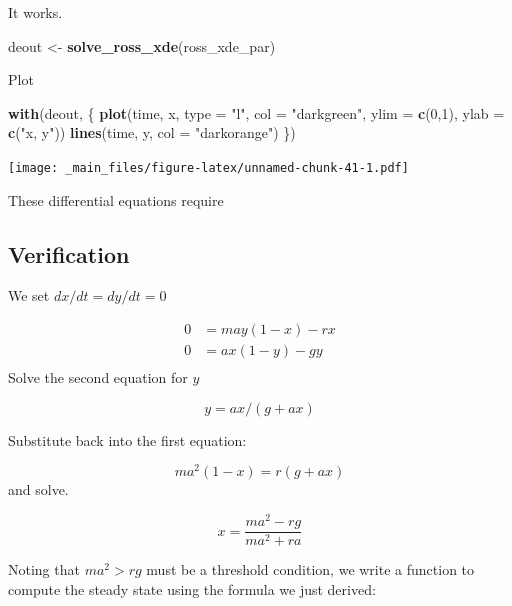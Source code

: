 \documentclass[
]{book}
\newenvironment{Shaded}{\begin{snugshade}}{\end{snugshade}}
\newcommand{\AttributeTok}[1]{\textcolor[rgb]{0.13,0.29,0.53}{#1}}
\newcommand{\DecValTok}[1]{\textcolor[rgb]{0.00,0.00,0.81}{#1}}
\newcommand{\FunctionTok}[1]{\textcolor[rgb]{0.13,0.29,0.53}{\textbf{#1}}}
\newcommand{\NormalTok}[1]{#1}
\newcommand{\OtherTok}[1]{\textcolor[rgb]{0.56,0.35,0.01}{#1}}
\newcommand{\StringTok}[1]{\textcolor[rgb]{0.31,0.60,0.02}{#1}}
\begin{document}
It works.

\begin{Shaded}
\begin{Highlighting}[]
\NormalTok{deout }\OtherTok{\textless{}{-}} \FunctionTok{solve\_ross\_xde}\NormalTok{(ross\_xde\_par)}
\end{Highlighting}
\end{Shaded}

Plot

\begin{Shaded}
\begin{Highlighting}[]
\FunctionTok{with}\NormalTok{(deout, \{}
  \FunctionTok{plot}\NormalTok{(time, x, }\AttributeTok{type =} \StringTok{"l"}\NormalTok{, }\AttributeTok{col =} \StringTok{"darkgreen"}\NormalTok{, }\AttributeTok{ylim =} \FunctionTok{c}\NormalTok{(}\DecValTok{0}\NormalTok{,}\DecValTok{1}\NormalTok{), }\AttributeTok{ylab =} \FunctionTok{c}\NormalTok{(}\StringTok{"x, y"}\NormalTok{))}
  \FunctionTok{lines}\NormalTok{(time, y, }\AttributeTok{col =} \StringTok{"darkorange"}\NormalTok{)}
\NormalTok{\})}
\end{Highlighting}
\end{Shaded}

\texttt{[image: \_main\_files/figure-latex/unnamed-chunk-41-1.pdf]}

These differential equations require

\subsection{Verification}\label{verification-1}

We set \(dx/dt = dy/dt=0\)

\[ 
\begin{array}{rl}
0 &= may(1-x) - r x\\
0 &= ax(1-y) - g y \\
\end{array}
\]
Solve the second equation for \(y\)

\[y = ax/(g+ax)\]

Substitute back into the first equation:

\[ma^2 (1-x) = r(g+ax)\]
and solve.

\[x = \frac{\textstyle{m a^2 - rg}}{\textstyle{m a^2 + ra}}\]

Noting that \(m a^2 > rg\) must be a threshold condition, we write a function to compute the steady state using the formula we just derived:
\end{document}

